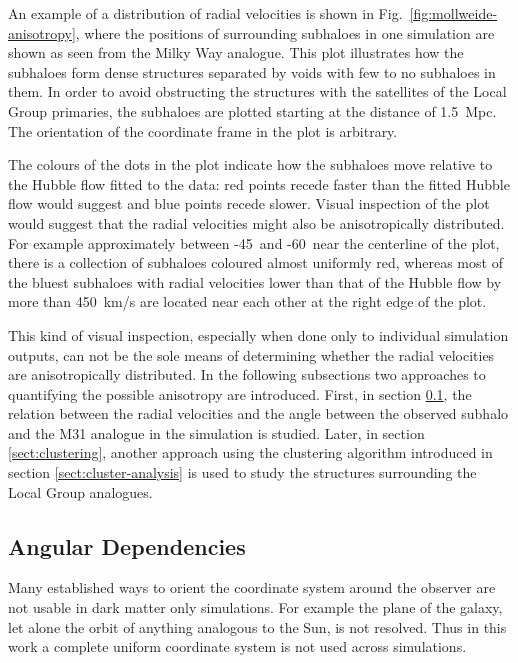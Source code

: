 \documentclass[english, oneside]{HYgradu}
\begin{document}
An example of a distribution of radial velocities is shown in Fig.~\ref{fig:mollweide-anisotropy}, where the positions of surrounding subhaloes in one simulation are shown as seen from the Milky Way analogue. This plot illustrates how the subhaloes form dense structures separated by voids with few to no subhaloes in them. In order to avoid obstructing the structures with the satellites of the Local Group primaries, the subhaloes are plotted starting at the distance of 1.5~Mpc. The orientation of the coordinate frame in the plot is arbitrary.

The colours of the dots in the plot indicate how the subhaloes move relative to the Hubble flow fitted to the data: red points recede faster than the fitted Hubble flow would suggest and blue points recede slower. Visual inspection of the plot would suggest that the radial velocities might also be anisotropically distributed. For example approximately between -45\textdegree\ and -60\textdegree\, near the centerline of the plot, there is a collection of subhaloes coloured almost uniformly red, whereas most of the bluest subhaloes with radial velocities lower than that of the Hubble flow by more than 450~km/s are located near each other at the right edge of the plot.

This kind of visual inspection, especially when done only to individual simulation outputs, can not be the sole means of determining whether the radial velocities are anisotropically distributed. In the following subsections two approaches to quantifying the possible anisotropy are introduced. First, in section \ref{sect:angular-dependencies}, the relation between the radial velocities and the angle between the observed subhalo and the M31 analogue in the simulation is studied. Later, in section \ref{sect:clustering}, another approach using the clustering algorithm introduced in section \ref{sect:cluster-analysis} is used to study the structures surrounding the Local Group analogues.

\subsection{Angular Dependencies}\label{sect:angular-dependencies}
Many established ways to orient the coordinate system around the observer are not usable in dark matter only simulations. For example the plane of the galaxy, let alone the orbit of anything analogous to the Sun, is not resolved. Thus in this work a complete uniform coordinate system is not used across simulations.
\end{document}
